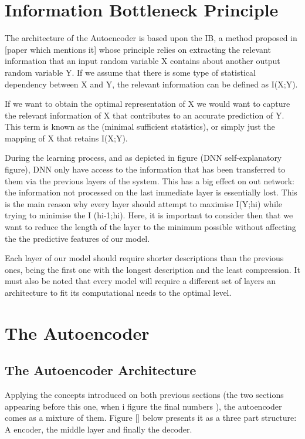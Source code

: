 \section{Information Bottleneck Principle}

The architecture of the Autoencoder is based upon the IB, a method proposed in [paper which mentions it] whose principle relies on extracting the relevant information that an input random variable X contains about another output random variable Y. If we assume that there is some type of statistical dependency between X and Y, the relevant information can be defined as I(X;Y).\par

If we want to obtain the optimal representation of X we would want to capture the relevant information of X that contributes to an accurate prediction of Y. This term is known as the (minimal sufficient statistics), or simply just the mapping of X that retains I(X;Y).\par

During the learning process, and as depicted in figure (DNN self-explanatory figure), DNN only have access to the information that has been transferred to them via the previous layers of the system. This has a big effect on out network: the information not processed on the last immediate layer is essentially lost. This is the main reason why every layer should attempt to maximise I(Y;hi) while trying to minimise the I (hi-1;hi). Here, it is important to consider then that we want to reduce the length of the layer to the minimum possible without affecting the the predictive features of our model.

Each layer of our model should require shorter descriptions than the previous ones, being the first one with the longest description and the least compression. It must also be noted that every model will require a different set of layers an architecture to fit its computational needs to the optimal level.

\section{The Autoencoder}

\subsection{The Autoencoder Architecture}

Applying the concepts introduced on both previous sections (the two sections appearing before this one, when  i figure the final numbers ), the autoencoder comes as a mixture of them. Figure [] below presents it as a three part structure: A encoder, the middle layer and finally the decoder. \par

